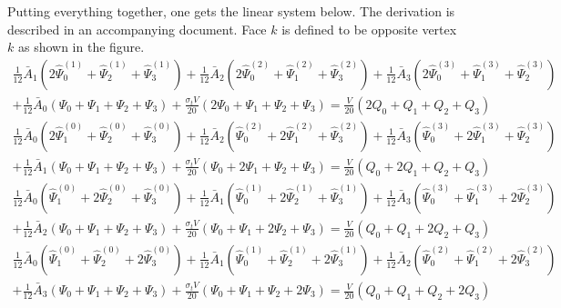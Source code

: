 \documentclass[12pt,letterpaper]{article}
\begin{document}
Putting everything together, one gets the linear system below.
The derivation is described in an accompanying document.
Face $k$ is defined to be opposite vertex $k$ as shown in the figure.
\begin{align*}
\frac{1}{12} \bar{A}_1 \left( 2\hat{\Psi}^{(1)}_0 + \hat{\Psi}^{(1)}_2 + \hat{\Psi}^{(1)}_3 \right)
+ \frac{1}{12} \bar{A}_2 \left( 2\hat{\Psi}^{(2)}_0 + \hat{\Psi}^{(2)}_1 + \hat{\Psi}^{(2)}_3 \right)
+ \frac{1}{12} \bar{A}_3 \left( 2\hat{\Psi}^{(3)}_0 + \hat{\Psi}^{(3)}_1 + \hat{\Psi}^{(3)}_2 \right) \\
+ \frac{1}{12} \bar{A}_0 \left( \Psi_0 + \Psi_1 + \Psi_2 + \Psi_3 \right)
+ \frac{\sigma_t V}{20} \left( 2\Psi_0 + \Psi_1 + \Psi_2 + \Psi_3 \right)
= \frac{V}{20} \left( 2Q_0 + Q_1 + Q_2 + Q_3 \right)
\end{align*}
\begin{align*}
\frac{1}{12} \bar{A}_0 \left( 2\hat{\Psi}^{(0)}_1 + \hat{\Psi}^{(0)}_2 + \hat{\Psi}^{(0)}_3 \right)
+ \frac{1}{12} \bar{A}_2 \left( \hat{\Psi}^{(2)}_0 + 2\hat{\Psi}^{(2)}_1 + \hat{\Psi}^{(2)}_3 \right)
+ \frac{1}{12} \bar{A}_3 \left( \hat{\Psi}^{(3)}_0 + 2\hat{\Psi}^{(3)}_1 + \hat{\Psi}^{(3)}_2 \right) \\
+ \frac{1}{12} \bar{A}_1 \left( \Psi_0 + \Psi_1 + \Psi_2 + \Psi_3 \right)
+ \frac{\sigma_t V}{20} \left( \Psi_0 + 2\Psi_1 + \Psi_2 + \Psi_3 \right)
= \frac{V}{20} \left( Q_0 + 2Q_1 + Q_2 + Q_3 \right)
\end{align*}
\begin{align*}
\frac{1}{12} \bar{A}_0 \left( \hat{\Psi}^{(0)}_1 + 2\hat{\Psi}^{(0)}_2 + \hat{\Psi}^{(0)}_3 \right)
+ \frac{1}{12} \bar{A}_1 \left( \hat{\Psi}^{(1)}_0 + 2\hat{\Psi}^{(1)}_2 + \hat{\Psi}^{(1)}_3 \right)
+ \frac{1}{12} \bar{A}_3 \left( \hat{\Psi}^{(3)}_0 + \hat{\Psi}^{(3)}_1 + 2\hat{\Psi}^{(3)}_2 \right) \\
+ \frac{1}{12} \bar{A}_2 \left( \Psi_0 + \Psi_1 + \Psi_2 + \Psi_3 \right)
+ \frac{\sigma_t V}{20} \left( \Psi_0 + \Psi_1 + 2\Psi_2 + \Psi_3 \right)
= \frac{V}{20} \left( Q_0 + Q_1 + 2Q_2 + Q_3 \right)
\end{align*}
\begin{align*}
\frac{1}{12} \bar{A}_0 \left( \hat{\Psi}^{(0)}_1 + \hat{\Psi}^{(0)}_2 + 2\hat{\Psi}^{(0)}_3 \right)
+ \frac{1}{12} \bar{A}_1 \left( \hat{\Psi}^{(1)}_0 + \hat{\Psi}^{(1)}_2 + 2\hat{\Psi}^{(1)}_3 \right)
+ \frac{1}{12} \bar{A}_2 \left( \hat{\Psi}^{(2)}_0 + \hat{\Psi}^{(2)}_1 + 2\hat{\Psi}^{(2)}_3 \right) \\
+ \frac{1}{12} \bar{A}_3 \left( \Psi_0 + \Psi_1 + \Psi_2 + \Psi_3 \right)
+ \frac{\sigma_t V}{20} \left( \Psi_0 + \Psi_1 + \Psi_2 + 2\Psi_3 \right)
= \frac{V}{20} \left( Q_0 + Q_1 + Q_2 + 2Q_3 \right)
\end{align*}
\end{document}
